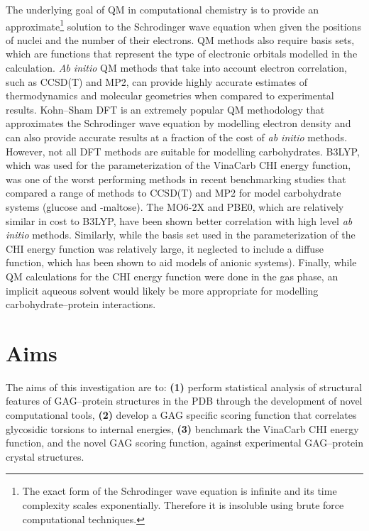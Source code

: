 \documentclass[journal=jctcce,manuscript=article]{achemso}
\begin{document}
{The underlying goal of \ac{QM} in computational chemistry is to provide an approximate\footnote{The exact form of the Schrodinger wave equation is infinite and its time complexity scales exponentially. Therefore it is insoluble using brute force computational techniques.} solution to the Schrodinger wave equation when given the positions of nuclei and the number of their electrons.
\ac{QM} methods also require basis sets, which are functions that represent the type of electronic orbitals modelled in the calculation.
\textit{Ab initio} \ac{QM} methods that take into account electron correlation, such as CCSD(T) and MP2, can provide highly accurate estimates of thermodynamics and molecular geometries when compared to experimental results. Kohn--Sham \ac{DFT} is an extremely popular \ac{QM} methodology that approximates the Schrodinger wave equation by modelling electron density and can also provide accurate results at a fraction of the cost of \textit{ab initio} methods. However, not all DFT methods are suitable for modelling carbohydrates. B3LYP, which was used for the parameterization of the VinaCarb \ac{CHI} energy function, was one of the worst performing methods in recent benchmarking studies that compared a range of methods to CCSD(T) and MP2 for model carbohydrate systems (glucose and \textalpha-maltose).
The MO6-2X and PBE0, which are relatively similar in cost to B3LYP, have been shown better correlation with high level \textit{ab initio} methods.  
Similarly, while the basis set used in the parameterization of the \ac{CHI} energy function was relatively large, it neglected to include a diffuse function, which has been shown to aid models of anionic systems). Finally, while \ac{QM} calculations for the \ac{CHI} energy function were done in the gas phase, an implicit aqueous solvent would likely be more appropriate for modelling carbohydrate--protein interactions.

\pagebreak
\section{Aims}

The aims of this investigation are to: \textbf{(1)} perform statistical analysis of structural features of \ac{GAG}--protein structures in the PDB through the development of novel computational tools, \textbf{(2)} develop a \ac{GAG} specific scoring function that correlates glycosidic torsions to internal energies, \textbf{(3)} benchmark the VinaCarb \ac{CHI} energy function, and the novel \ac{GAG} scoring function, against experimental \ac{GAG}--protein crystal structures.

}
\end{document}
